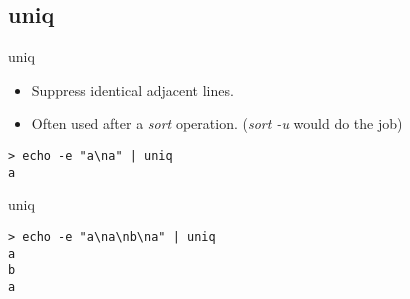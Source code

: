 \subsection{uniq}

\begin{frame}[fragile]{uniq}
\begin{itemize}
\item Suppress identical adjacent lines.
  \pause \item Often used after a \emph{sort} operation. (\emph{sort -u} would do the job)
\end{itemize}
  \pause
  \begin{exampleblock}{}
    \begin{lstlisting}[showstringspaces=false]
> echo -e "a\na" | uniq
a
    \end{lstlisting}
  \end{exampleblock}
\end{frame}

\begin{frame}[fragile]{uniq}
  \begin{exampleblock}{}
    \begin{lstlisting}[showstringspaces=false]
> echo -e "a\na\nb\na" | uniq
a
b
a
    \end{lstlisting}
  \end{exampleblock}
\end{frame}
